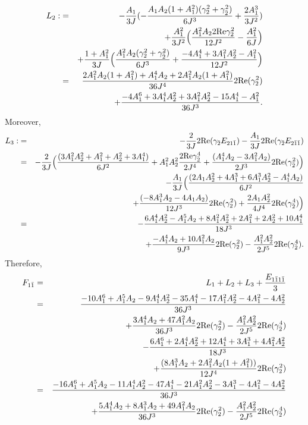 \documentclass[12pt]{amsart}
\begin{document}
\begin{eqnarray*}
L_2:&=& -{A_1 \over 3J} ( -{A_1A_2 (1+A_1^2) (\gamma_2^2+ \gamma_{\bar2}^2)
\over 6  J^3}+{2A_1^3  \over 3 J^2})\\
&&+{A_1^2 \over 3J^2} \Big( {A_1^2 A_2 2\hbox{Re} \gamma_2^2 \over 12J^2}-{A_1^2\over 6J} \Big)\\
&& +{1+A_1^2 \over 3J}\Big({ A_1^2 A_2 (\gamma_2^2+ \gamma_{\bar2}^2 ) \over 6 J^3}
+{ -4A_1^4 +3A_1^2A_2^2 -A_1^2  \over 12 J^2}\Big)\\
&=& {2 A_1^2A_2(1+A_1^2) +A_1^4A_2+2A_1^2A_2(1+A_1^2)\over 36 J^4}  2\hbox{Re}(\gamma_2^2) \\
&&+{ -4A_1^6 +3A_1^4A_2^2 +3A_1^2A_2^2-15A_1^4-A_1^2 \over 36 J^3}.
\end{eqnarray*}
Moreover,
\begin{eqnarray*}
L_3:&=& -{2\over 3J} 2\hbox{Re}(\gamma_{\bar2} E_{2 1\bar1})-{A_1\over 3J} 2\hbox{Re}(\gamma_{\bar2} E_{2 \bar1\bar1})\\
&=&-{2\over 3J} \Big({(3A_1^2A_2^2+A_1^2+A_2^2+3A_1^4) \over 6 J^2} + A_1^2A_2^2{ 2\hbox{Re} \gamma_{\bar2}^4  \over 2 J^4} 
+{ (A_1^4 A_2 -3A_1^2 A_2) \over 2 J^3} 2\hbox{Re}( \gamma_{\bar2} ^2)
\Big)\\
&&-{A_1\over 3J}\Big({(2A_1 A_2^2 
+ 4A_1^3+6A_1^3A_2^2 -A_1^4A_2)  \over 6 J^2}\\
&&\qquad\qquad +{(-8A_1^3 A_2- 4A_1 A_2)   \over 12 J^3} 2\hbox{Re}(\gamma_2^2) +{2A_1A_2^2\over 4J^4} 2\hbox{Re}( \gamma_{\bar2}^4)\Big) \\
&=& -{6A_1^4 A_2^2 -A_1^5A_2+8A_1^2A_2^2+2A_1^2+2A_2^2+10A_1^4 \over 18 J^3}\\
&&+{-A_1^4 A_2+10 A_1^2 A_2   \over 9 J^3} 2\hbox{Re}(\gamma_2^2) -{A_1^2A_2^2\over 2 J^5} 2\hbox{Re}( \gamma_{\bar2}^4).
\end{eqnarray*}
Therefore,
\begin{eqnarray*}
F_{1\bar1}&=& L_1+L_2+L_3+{E_{1\bar1 1 \bar1} \over 3}\\
&=& {-10A_1^6 +A_1^5A_2 -9A_1^4A_2^2 -35 A_1^4 -17 A_1^2 A_2^2 -4A_1^2-4A_2^2\over 36 J^3} \\
&& +{3A_1^4 A_2+47 A_1^2 A_2   \over 36 J^3} 2\hbox{Re}(\gamma_2^2) -{A_1^2A_2^2\over 2 J^5} 2\hbox{Re}( \gamma_{\bar2}^4)\\
&&-{6A_1^6 +2A_1^4 A_2^2 +12A_1^4+3A_1^3+4A_1^2A_2^2 \over 18 J^3}\\
&&+{(8A_1^3A_2 +2A_1^2A_2(1+A_1^2)) \over 12J^4} 2\hbox{Re}(\gamma_2^2)\\
&=& {-16A_1^6 +A_1^5A_2 -11A_1^4A_2^2 -47 A_1^4 -21 A_1^2 A_2^2 -3A_1^3 -4A_1^2-4A_2^2\over 36 J^3} \\
&& +{5A_1^4 A_2+8A_1^3A_2+49 A_1^2 A_2   \over 36 J^3} 2\hbox{Re}(\gamma_2^2) -{A_1^2A_2^2\over 2 J^5} 2\hbox{Re}( \gamma_{\bar2}^4)\\
\end{eqnarray*}
\end{document}
